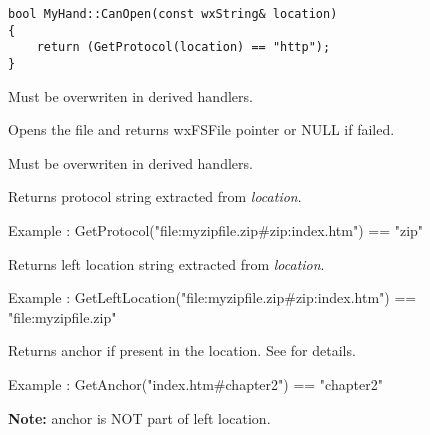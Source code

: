 \begin{verbatim}
bool MyHand::CanOpen(const wxString& location) 
{
    return (GetProtocol(location) == "http");
}
\end{verbatim}

Must be overwriten in derived handlers.

\label{wxfilesystemhandleropenfile}


Opens the file and returns wxFSFile pointer or NULL if failed.

Must be overwriten in derived handlers.






\label{wxfilesystemhandlergetprotocol}


Returns protocol string extracted from {\it location}. 

Example : GetProtocol("file:myzipfile.zip\#zip:index.htm") == "zip"

\label{wxfilesystemhandlergetleftlocation}


Returns left location string extracted from {\it location}. 

Example : GetLeftLocation("file:myzipfile.zip\#zip:index.htm") == "file:myzipfile.zip"


\label{wxfilesystemhandlergetanchor}


Returns anchor if present in the location.
See  for details.

Example : GetAnchor("index.htm\#chapter2") == "chapter2"

{\bf Note:} anchor is NOT part of left location.

